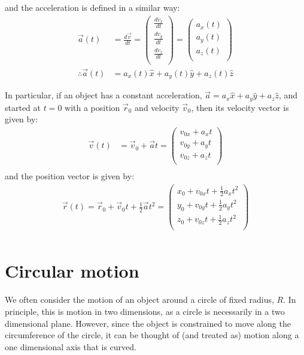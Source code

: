 and the acceleration is defined in a similar way:
\begin{align*}
\vec a(t)  &=\frac{d\vec v}{dt}
 =\begin{pmatrix}
           \frac{dv_x}{dt}  \\
          \frac{dv_y}{dt}  \\
          \frac{dv_z}{dt}  \\
         \end{pmatrix}
 =\begin{pmatrix}
           a_x(t) \\
           a_y(t) \\
           a_z(t) \\
         \end{pmatrix}\\   
\therefore \vec a(t) &= a_x(t)\hat x+a_y(t)\hat y+a_z(t)\hat z  \nonumber 
\end{align*}

In particular, if an object has a constant acceleration, $\vec a=a_x\hat x+a_y\hat y+a_z\hat z$, and started at $t=0$ with a position $\vec r_0$ and velocity $\vec v_0$, then its velocity vector is given by:
\begin{align*}
\vec v(t)  &= \vec v_0+\vec at=\begin{pmatrix}
           v_{0x}+ a_xt \\
           v_{0y}+ a_yt \\
           v_{0z}+ a_zt \\
         \end{pmatrix}\\
\end{align*}
and the position vector is given by:
\begin{align*}
\vec r(t)= \vec r_0+\vec v_0 t+\frac{1}{2}\vec a t^2=\begin{pmatrix}
           x_0+v_{0x}t+\frac{1}{2} a_xt^2 \\
           y_0+v_{0y}t+\frac{1}{2} a_yt^2 \\
           z_0+v_{0z}t+\frac{1}{2} a_zt^2 \\
         \end{pmatrix}\\
\end{align*}

\section{Circular motion}
We often consider the motion of an object around a circle of fixed radius, $R$. In principle, this is motion in two dimensions, as a circle is necessarily in a two dimensional plane. However, since the object is constrained to move along the circumference of the circle, it can be thought of (and treated as) motion along a one dimensional axis that is curved. 

